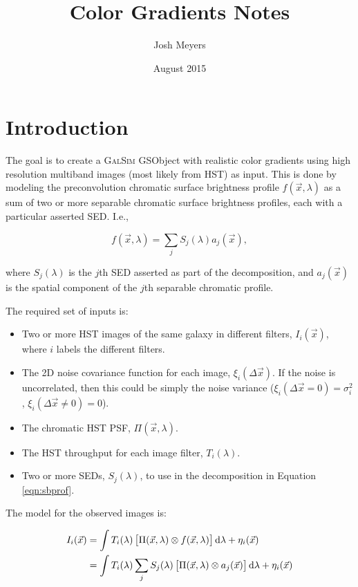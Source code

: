\documentclass{article}
\title{Color Gradients Notes}
\author{Josh Meyers}
\date{August 2015}
\begin{document}
\section{Introduction}

The goal is to create a \textsc{GalSim} GSObject with realistic color gradients using high
resolution multiband images (most likely from HST) as input.  This is done by modeling the
preconvolution chromatic surface brightness profile $f(\vec{x}, \lambda)$ as a sum of two or more
separable chromatic surface brightness profiles, each with a particular asserted SED.  I.e.,

\begin{equation}
    \label{eqn:sbprof}
    f(\vec{x}, \lambda) = \sum_j S_j(\lambda) a_j(\vec{x}),
\end{equation}

where $S_j(\lambda)$ is the $j$th SED asserted as part of the decomposition, and $a_j(\vec{x})$ is
the spatial component of the $j$th separable chromatic profile.

The required set of inputs is:

\begin{itemize}

\item Two or more HST images of the same galaxy in different filters, $I_i(\vec{x})$, where $i$
labels the different filters.

\item The 2D noise covariance function for each image, $\xi_i(\Delta\vec{x})$.  If the noise is
uncorrelated, then this could be simply the noise variance ($\xi_i(\Delta\vec{x}=0) = \sigma^2_i$, $\xi_i(\Delta\vec{x}\ne0)=0$).

\item The chromatic HST PSF, $\Pi(\vec{x}, \lambda)$.

\item The HST throughput for each image filter, $T_i(\lambda)$.

\item Two or more SEDs, $S_j(\lambda)$, to use in the decomposition in Equation \ref{eqn:sbprof}.

\end{itemize}

The model for the observed images is:

\begin{align}
    I_i(\vec{x})
    &= \int T_i(\lambda) \left[\Pi(\vec{x}, \lambda) \otimes f(\vec{x}, \lambda)\right] \dif{\lambda} + \eta_i(\vec{x}) \\
    &= \int T_i(\lambda) \sum_j S_j(\lambda) \left[\Pi(\vec{x}, \lambda) \otimes a_j(\vec{x})\right] \dif{\lambda} + \eta_i(\vec{x})
\end{align}
\end{document}
